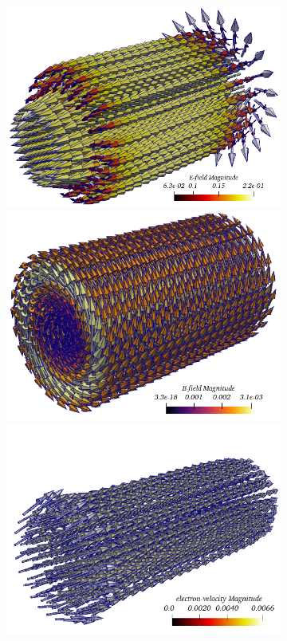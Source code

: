 \documentclass{article}
\begin{document}
\begin{figure}
\begin{subfigure}[b]{\textwidth}
        \includegraphics[scale=0.2]{E-field_lambda-0.png}
        \hspace{0.3cm}
        \includegraphics[scale=0.2]{B-field_lambda-0.png}
        \includegraphics[scale=0.2]{electronVel_lambda-0.png}

\end{subfigure}
\end{figure}
\end{document}
